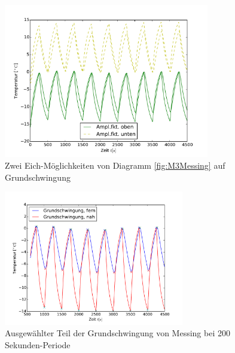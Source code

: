 \begin{figure}[h!]
	\centering
	\includegraphics[width=0.8\textwidth]{Bilder/Normierungsauswahl/M3_Alu_norm.pdf}
	\caption{ Zwei Eich-Möglichkeiten von Diagramm \ref{fig:M3Messing} auf Grundschwingung}
	\label{fig:M3MessingNorm}
\end{figure}
\begin{figure}[h!]
	\centering
	\includegraphics[width=0.7\textwidth]{Bilder/M3_Messing_norm.pdf}
	\caption{Ausgewählter Teil der Grundschwingung von Messing bei 200 Sekunden-Periode}
	\label{fig:M3MessingNormkurve}
\end{figure}
